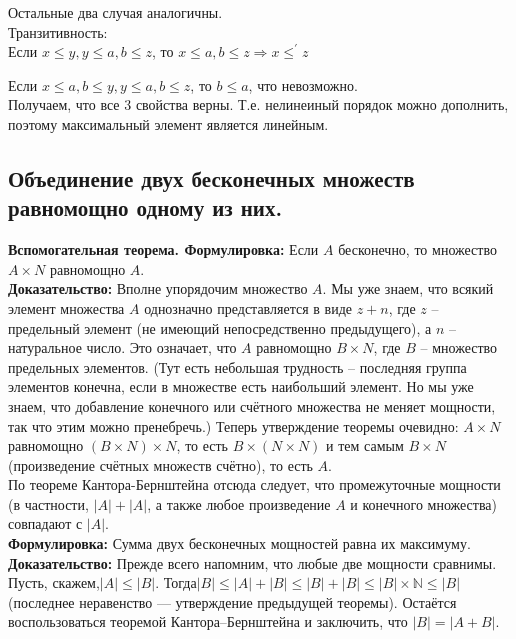 Остальные два случая аналогичны.\\

Транзитивность:\\

Если $x \leq y, y \leq a, b \leq z$, то $x \leq a, b \leq z \Rightarrow x \leq^{'} z$

Если $x \leq a, b \leq y, y \leq a, b \leq z$, то $b \leq a$, что невозможно.\\

Получаем, что все 3 свойства верны. 
Т.е. нелинеиный порядок можно дополнить, поэтому максимальный элемент является линейным.

\subsection{Объединение двух бесконечных множеств равномощно одному из них.}

\textbf{Вспомогательная теорема. Формулировка:}  Если $A$ бесконечно, то множество $A \times N$ равномощно $A$. \\

\textbf{Доказательство:} Вполне упорядочим множество $A$. Мы уже знаем, что всякий элемент множества $A$  однозначно представляется в виде $z + n$, где $z$ --  предельный элемент (не имеющий непосредственно предыдущего), а $n$ -- натуральное число. Это означает, что $A$ равномощно $B \times N$, где $B$ -- множество предельных элементов. (Тут есть небольшая трудность --  последняя группа элементов конечна, если в множестве есть наибольший элемент. Но мы уже знаем, что добавление конечного или счётного множества не меняет мощности, так что этим можно пренебречь.) Теперь утверждение теоремы очевидно: $A \times N$ равномощно $(B \times N) \times N$, то есть $B \times (N \times N)$ и тем самым $B \times N$ (произведение счётных множеств счётно), то есть $A$. \\

По теореме Кантора-Бернштейна отсюда следует, что промежуточные мощности (в частности, $|A|+|A|$, а также любое произведение $A$ и конечного множества) совпадают с $|A|$. \\

\textbf{Формулировка: } Сумма двух бесконечных мощностей равна их максимуму. 
\textbf{Доказательство: } Прежде всего напомним, что любые две мощности сравнимы. Пусть, скажем,$|A| \leq |B|$. Тогда$|B| \leq |A|+|B| \leq |B|+|B| \leq |B| \times \mathbb{N} \leq |B|$ (последнее неравенство — утверждение предыдущей теоремы). Остаётся воспользоваться теоремой Кантора–Бернштейна и заключить, что $|B|=|A + B|$.

